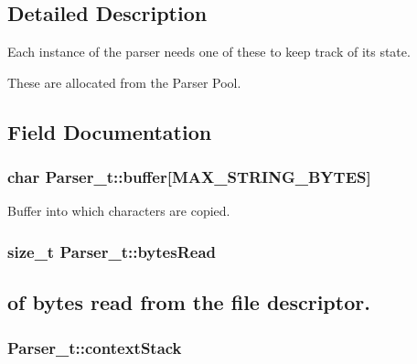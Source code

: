 \subsection{Detailed Description}
Each instance of the parser needs one of these to keep track of its state.

These are allocated from the Parser Pool. 

\subsection{Field Documentation}
\subsubsection[{\texorpdfstring{buffer}{buffer}}]{\setlength{\rightskip}{0pt plus 5cm}char Parser\+\_\+t\+::buffer\mbox{[}{\bf M\+A\+X\+\_\+\+S\+T\+R\+I\+N\+G\+\_\+\+B\+Y\+T\+ES}\mbox{]}}\hypertarget{struct_parser__t_a73fb0aaca3e03374d6863544889bee47}{}\label{struct_parser__t_a73fb0aaca3e03374d6863544889bee47}


Buffer into which characters are copied. 

\subsubsection[{\texorpdfstring{bytes\+Read}{bytesRead}}]{\setlength{\rightskip}{0pt plus 5cm}size\+\_\+t Parser\+\_\+t\+::bytes\+Read}\hypertarget{struct_parser__t_a1f4d91adc2810910069e6539e6145248}{}\label{struct_parser__t_a1f4d91adc2810910069e6539e6145248}


\subsection*{of bytes read from the file descriptor.}

\subsubsection[{\texorpdfstring{context\+Stack}{contextStack}}]{ Parser\+\_\+t\+::context\+Stack}\hypertarget{struct_parser__t_abb45dff4d21a69964649e5a108c2dde2}{}\label{struct_parser__t_abb45dff4d21a69964649e5a108c2dde2}


